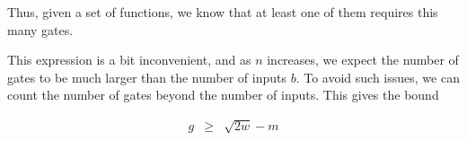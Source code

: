 \documentclass[12pt]{article}
\theoremstyle{definition}
\begin{document}
Thus, given a set of functions, we know that at least one of them requires
this many gates.

This expression is a bit inconvenient, and as $n$ increases, we
expect the number of gates to be much larger than the number of
inputs $b$. To avoid such issues, we can count the number of gates
beyond the number of inputs. This gives the bound

\begin{eqnarray*}
	g & \ge & \sqrt{2w} - m \\
\end{eqnarray*}




\end{document}
